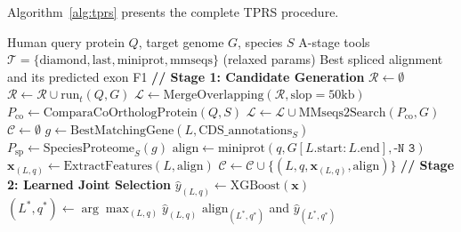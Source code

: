 Algorithm~\ref{alg:tprs} presents the complete TPRS procedure.

\begin{algorithm}[t]
\caption{TPRS: Candidate Generation + Learned Joint Selection}
\label{alg:tprs}
\begin{algorithmic}[1]
\small
\Require Human query protein $Q$, target genome $G$, species $S$
\Require A-stage tools $\mathcal{T} = \{\text{diamond}, \text{last}, \text{miniprot}, \text{mmseqs}\}$ (relaxed params)
\Ensure Best spliced alignment and its predicted exon F1
\State \textbf{// Stage 1: Candidate Generation}
\State $\mathcal{R} \gets \emptyset$ 
    \State $\mathcal{R} \gets \mathcal{R} \cup \text{run}_t(Q, G)$ 
\EndFor
\State $\mathcal{L} \gets \text{MergeOverlapping}(\mathcal{R}, \text{slop}=50\text{kb})$ 
    \State $P_{\text{co}} \gets \text{ComparaCoOrthologProtein}(Q, S)$ 
    \State $\mathcal{L} \gets \mathcal{L} \cup \text{MMseqs2Search}(P_{\text{co}}, G)$
\EndIf
\State $\mathcal{C} \gets \emptyset$ 
    \State $g \gets \text{BestMatchingGene}(L, \text{CDS\_annotations}_S)$
    \State $P_{\text{sp}} \gets \text{SpeciesProteome}_S(g)$
        \State $\text{align} \gets \text{miniprot}(q, G[L.\text{start}:L.\text{end}], \texttt{-N~3})$
        \State $\mathbf{x}_{(L,q)} \gets \text{ExtractFeatures}(L, \text{align})$ 
        \State $\mathcal{C} \gets \mathcal{C} \cup \{(L, q, \mathbf{x}_{(L,q)}, \text{align})\}$
    \EndFor
\EndFor
\State \textbf{// Stage 2: Learned Joint Selection}
    \State $\hat{y}_{(L,q)} \gets \text{XGBoost}(\mathbf{x})$ 
\EndFor
\State $(L^*, q^*) \gets \arg\max_{(L,q)} \hat{y}_{(L,q)}$
\State \Return $\text{align}_{(L^*,q^*)}$ and $\hat{y}_{(L^*,q^*)}$
\end{algorithmic}
\end{algorithm}
